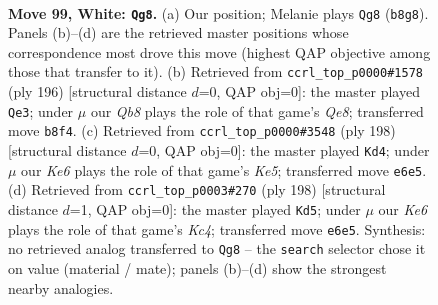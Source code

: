 \documentclass[11pt]{article}
\begin{document}
\clearpage

\begin{figure}[p]\centering
\begin{subfigure}{0.46\textwidth}\centering
\resizebox{\linewidth}{!}{%
\newchessgame
\chessboard[
  setfen={1Q6/8/4K2k/8/8/8/8/8 w - - 9 99},
  showmover=false,
  pgfstyle=straightmove, color=movearrow, markmove={b8-g8}
]}
\caption{}
\end{subfigure}\hfill
\begin{subfigure}{0.46\textwidth}\centering
\resizebox{\linewidth}{!}{%
\newchessgame
\chessboard[
  setfen={4Q3/8/8/8/8/6K1/2k5/8 w - - 0 99},
  showmover=false,
  pgfstyle=straightmove, color=movearrow, markmove={e8-e3}
]}
\caption{}
\end{subfigure}
\\[4pt]
\begin{subfigure}{0.46\textwidth}\centering
\resizebox{\linewidth}{!}{%
\newchessgame
\chessboard[
  setfen={3Q4/8/8/4K3/1k6/8/8/8 w - - 0 100},
  showmover=false,
  pgfstyle=straightmove, color=movearrow, markmove={e5-d4}
]}
\caption{}
\end{subfigure}\hfill
\begin{subfigure}{0.46\textwidth}\centering
\resizebox{\linewidth}{!}{%
\newchessgame
\chessboard[
  setfen={8/8/1k6/8/2K5/8/6Q1/8 w - - 1 100},
  showmover=false,
  pgfstyle=straightmove, color=movearrow, markmove={c4-d5}
]}
\caption{}
\end{subfigure}
\caption{\textbf{Move 99, White: \texttt{Qg8}.} (a) Our position; Melanie plays \texttt{Qg8} (\texttt{b8g8}). Panels (b)--(d) are the retrieved master positions whose correspondence most drove this move (highest QAP objective among those that transfer to it). (b) Retrieved from \texttt{ccrl\_top\_p0000\#1578} (ply 196) [structural distance $d$=0, QAP obj=0]: the master played \texttt{Qe3}; under $\mu$ our \emph{Qb8} plays the role of that game's \emph{Qe8}; transferred move \texttt{b8f4}. (c) Retrieved from \texttt{ccrl\_top\_p0000\#3548} (ply 198) [structural distance $d$=0, QAP obj=0]: the master played \texttt{Kd4}; under $\mu$ our \emph{Ke6} plays the role of that game's \emph{Ke5}; transferred move \texttt{e6e5}. (d) Retrieved from \texttt{ccrl\_top\_p0003\#270} (ply 198) [structural distance $d$=1, QAP obj=0]: the master played \texttt{Kd5}; under $\mu$ our \emph{Ke6} plays the role of that game's \emph{Kc4}; transferred move \texttt{e6e5}. Synthesis: no retrieved analog transferred to \texttt{Qg8} -- the \texttt{search} selector chose it on value (material / mate); panels (b)--(d) show the strongest nearby analogies.}
\label{fig:thought-m196}
\end{figure}
\end{document}
